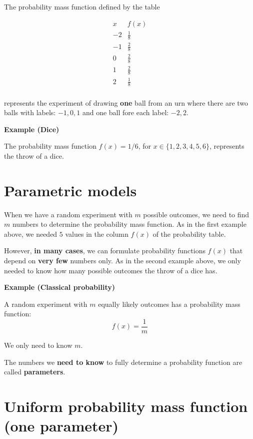 \documentclass[
]{book}
\begin{document}
The probability mass function defined by the table

\[
\begin{array}{cc}
x & f(x) \\
-2 & \frac{1}{8} \\
-1 & \frac{2}{8} \\
0  & \frac{2}{8} \\
1  & \frac{2}{8} \\
2  & \frac{1}{8} \\
\end{array}
\]

represents the experiment of drawing \textbf{one} ball from an urn where there are two balls with labels: \(-1, 0, 1\) and one ball fore each label: \(-2, 2\).

\textbf{Example (Dice)}

The probability mass function \(f(x)=1/6\), for \(x\in\{1,2,3,4,5,6\}\), represents the throw of a dice.

\hypertarget{parametric-models}{%
\section{Parametric models}\label{parametric-models}}

When we have a random experiment with \(m\) possible outcomes, we need to find \(m\) numbers to determine the probability mass function. As in the first example above, we needed \(5\) values in the column \(f(x)\) of the probability table.

However, \textbf{in many cases}, we can formulate probability functions \(f(x)\) that depend on \textbf{very few} numbers only. As in the second example above, we only needed to know how many possible outcomes the throw of a dice has.

\textbf{Example (Classical probability)}

A random experiment with \(m\) equally likely outcomes has a probability mass function:
\[f(x)=\frac{1}{m}\]

We only need to know \(m\).

The numbers we \textbf{need to know} to fully determine a probability function are called \textbf{parameters}.

\hypertarget{uniform-probability-mass-function-one-parameter}{%
\section{Uniform probability mass function (one parameter)}\label{uniform-probability-mass-function-one-parameter}}
\end{document}
